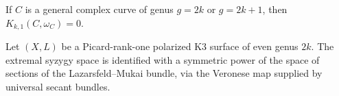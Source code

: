 \begin{theorem}
\label{universal-secant-bundles-syzygies-canonical-curves-main}
If $C$ is a general complex curve of genus $g=2k$ or $g=2k+1$, then $K_{k,1}(C,\omega_C)=0$.
\notready
\end{theorem}

\begin{theorem}
\label{universal-secant-bundles-syzygies-canonical-curves-secondary}
Let $(X,L)$ be a Picard-rank-one polarized K3 surface of even genus $2k$. The extremal syzygy space is identified with a symmetric power of the space of sections of the Lazarsfeld--Mukai bundle, via the Veronese map supplied by universal secant bundles.
\notready
\end{theorem}
